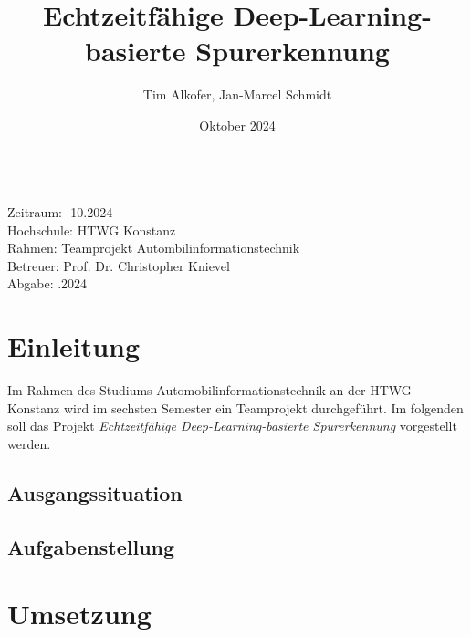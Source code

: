 \documentclass{article}
\title{Echtzeitfähige Deep-Learning-basierte Spurerkennung}
\author{Tim Alkofer, Jan-Marcel Schmidt}
\date{Oktober 2024} %
\begin{document}
    
    \maketitle
    
    \begin{tabbing}
    \hspace{5em} \= \\
        Zeitraum: -10.2024 \\ %
        Hochschule: \> HTWG Konstanz \\
        Rahmen: \> Teamprojekt Autombilinformationstechnik \\
        Betreuer: \> Prof. Dr. Christopher Knievel \\
        Abgabe: .2024 \\ %
    \end{tabbing}

    \clearpage
    \tableofcontents
    \clearpage
    \listoffigures
    \clearpage
    
    
    \clearpage

    \section{Einleitung}
        Im Rahmen des Studiums Automobilinformationstechnik an der HTWG Konstanz wird im sechsten Semester ein Teamprojekt durchgeführt.
        Im folgenden soll das Projekt \textit{Echtzeitfähige Deep-Learning-basierte Spurerkennung} vorgestellt werden.

        \subsection{Ausgangssituation}

        \subsection{Aufgabenstellung}
    \section{Umsetzung}
\end{document}
